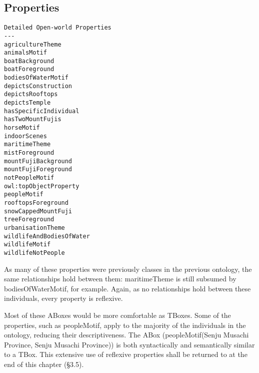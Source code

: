 \documentclass[titlepage,a4paper,12pt,oneside]{book}
\begin{document}
\subsection{Properties}
\begin{lstlisting}
Detailed Open-world Properties
---
agricultureTheme
animalsMotif
boatBackground
boatForeground
bodiesOfWaterMotif
depictsConstruction
depictsRooftops
depictsTemple
hasSpecificIndividual
hasTwoMountFujis
horseMotif
indoorScenes
maritimeTheme
mistForeground
mountFujiBackground
mountFujiForeground
notPeopleMotif
owl:topObjectProperty
peopleMotif
rooftopsForeground
snowCappedMountFuji
treeForeground
urbanisationTheme
wildlifeAndBodiesOfWater
wildlifeMotif
wildlifeNotPeople
\end{lstlisting}
As many of these properties were previously classes in the previous ontology, the same relationships hold between them: maritimeTheme is still subsumed by bodiesOfWaterMotif, for example.
Again, as no relationships hold between these individuals, every property is reflexive.\par
Most of these ABoxes would be more comfortable as TBoxes.
Some of the properties, such as peopleMotif, apply to the majority of the individuals in the ontology, reducing their descriptiveness.
The ABox (peopleMotif(Senju Musachi Province, Senju Musachi Province)) is both syntactically and semantically similar to a TBox.
This extensive use of reflexive properties shall be returned to at the end of this chapter (§3.5).
\end{document}
